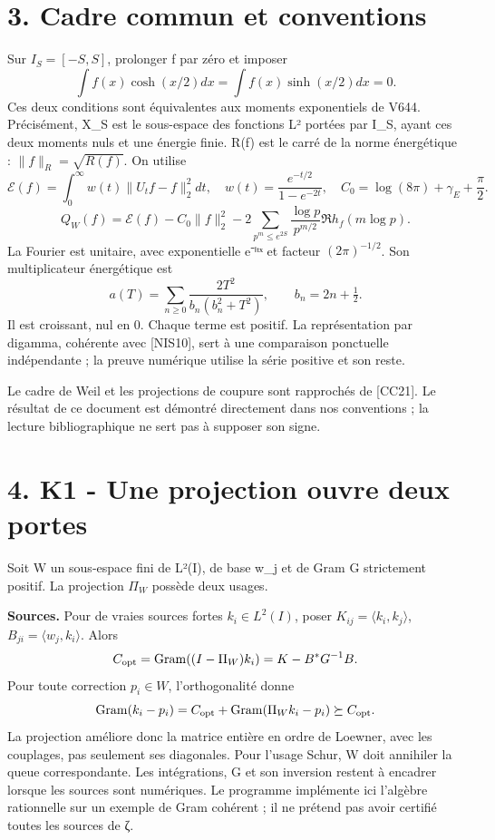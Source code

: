 \documentclass[
  10pt,
  a4paper,
]{article}
\begin{document}
\hypertarget{cadre-commun-et-conventions}{%
\section{3. Cadre commun et
conventions}\label{cadre-commun-et-conventions}}

Sur \(I_S=[-S,S]\), prolonger f par zéro et imposer \[
\int f(x)\cosh(x/2)dx=\int f(x)\sinh(x/2)dx=0.
\] Ces deux conditions sont équivalentes aux moments exponentiels de
V644. Précisément, X\_S est le sous-espace des fonctions L² portées par
I\_S, ayant ces deux moments nuls et une énergie finie. R(f) est le
carré de la norme énergétique : \(\|f\|_R=\sqrt{R(f)}\). On utilise \[
\mathcal E(f)=\int_0^\infty w(t)\|U_tf-f\|_2^2dt,
\quad w(t)=\frac{e^{-t/2}}{1-e^{-2t}},\quad
C_0=\log(8\pi)+\gamma_E+\frac\pi2.
\] \[
Q_W(f)=\mathcal E(f)-C_0\|f\|_2^2
-2\sum_{p^m\le e^{2S}}\frac{\log p}{p^{m/2}}\Re h_f(m\log p).
\] La Fourier est unitaire, avec exponentielle e⁻ⁱᵗˣ et facteur
\((2\pi)^{-1/2}\). Son multiplicateur énergétique est \[
a(T)=\sum_{n\ge0}\frac{2T^2}{b_n(b_n^2+T^2)},\qquad b_n=2n+\tfrac12.
\] Il est croissant, nul en 0. Chaque terme est positif. La
représentation par digamma, cohérente avec {[}NIS10{]}, sert à une
comparaison ponctuelle indépendante ; la preuve numérique utilise la
série positive et son reste.

Le cadre de Weil et les projections de coupure sont rapprochés de
{[}CC21{]}. Le résultat de ce document est démontré directement dans nos
conventions ; la lecture bibliographique ne sert pas à supposer son
signe.

\hypertarget{k1---une-projection-ouvre-deux-portes}{%
\section{4. K1 - Une projection ouvre deux
portes}\label{k1---une-projection-ouvre-deux-portes}}

Soit W un sous-espace fini de L²(I), de base w\_j et de Gram G
strictement positif. La projection \(\Pi_W\) possède deux usages.

\textbf{Sources.} Pour de vraies sources fortes \(k_i\in L^2(I)\), poser
\(K_{ij}=\langle k_i,k_j\rangle\), \(B_{ji}=\langle w_j,k_i\rangle\).
Alors \[
C_{\rm opt}=\operatorname{Gram}((I-\Pi_W)k_i)=K-B^*G^{-1}B.
\] Pour toute correction \(p_i\in W\), l'orthogonalité donne \[
\operatorname{Gram}(k_i-p_i)=C_{\rm opt}
+\operatorname{Gram}(\Pi_Wk_i-p_i)\succeq C_{\rm opt}.
\] La projection améliore donc la matrice entière en ordre de Loewner,
avec les couplages, pas seulement ses diagonales. Pour l'usage Schur, W
doit annihiler la queue correspondante. Les intégrations, G et son
inversion restent à encadrer lorsque les sources sont numériques. Le
programme implémente ici l'algèbre rationnelle sur un exemple de Gram
cohérent ; il ne prétend pas avoir certifié toutes les sources de ζ.
\end{document}
